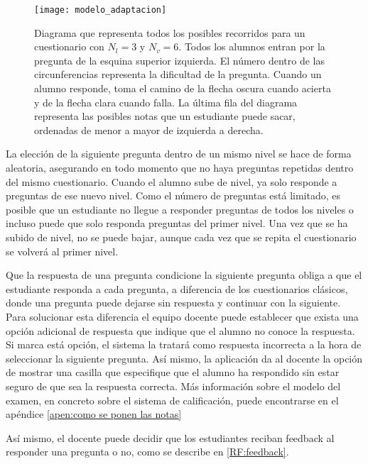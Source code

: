 \begin{figure}[htp!]
	\centering
	\texttt{[image: modelo\_adaptacion]}
	\caption[Modelo de adpatación]{Diagrama que representa todos los posibles recorridos para un cuestionario con $N_l = 3$ y $N_v = 6$. Todos los alumnos entran por la pregunta de la esquina superior izquierda. El número dentro de las circunferencias representa la dificultad de la pregunta. Cuando un alumno responde, toma el camino de la flecha oscura cuando acierta y de la flecha clara cuando falla. La última fila del diagrama representa las posibles notas que un estudiante puede sacar, ordenadas de menor a mayor de izquierda a derecha.}
	\label{fig:modelo de adaptacion}
\end{figure}

La elección de la siguiente pregunta dentro de un mismo nivel se hace de forma aleatoria, asegurando en todo momento que no haya preguntas repetidas dentro del mismo cuestionario. Cuando el alumno sube de nivel, ya solo responde a preguntas de ese nuevo nivel. Como el número de preguntas está limitado, es posible que un estudiante no llegue a responder preguntas de todos los niveles o incluso puede que solo responda preguntas del primer nivel. Una vez que se ha subido de nivel, no se puede bajar, aunque cada vez que se repita el cuestionario se volverá al primer nivel.

Que la respuesta de una pregunta condicione la siguiente pregunta obliga a que el estudiante responda a cada pregunta, a diferencia de los cuestionarios clásicos, donde una pregunta puede dejarse sin respuesta y continuar con la siguiente. Para solucionar esta diferencia el equipo docente puede establecer que exista una opción adicional de respuesta que indique que el alumno no conoce la respuesta. Si marca está opción, el sistema la tratará como respuesta incorrecta a la hora de seleccionar la siguiente pregunta. Así mismo, la aplicación da al docente la opción de mostrar una casilla que especifique que el alumno ha respondido sin estar seguro de que sea la respuesta correcta. Más información sobre el modelo del examen, en concreto sobre el sistema de calificación, puede encontrarse en el apéndice \ref{apen:como se ponen las notas}

Así mismo, el docente puede decidir que los estudiantes reciban feedback al responder una pregunta o no, como se describe en \ref{RF:feedback}.


